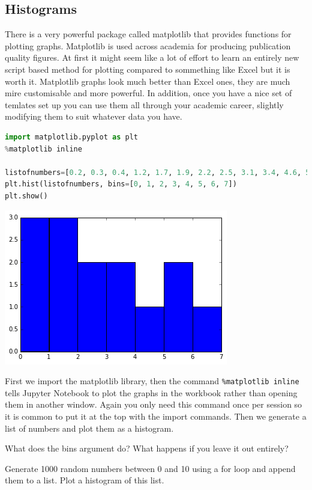	\subsection{Histograms}
		There is a very powerful package called matplotlib that provides functions for plotting graphs. Matplotlib is used across academia for producing publication quality figures. At first it might seem like a lot of effort to learn an entirely new script based method for plotting compared to sommething like Excel but it is worth it. Matplotlib graphs look much better than Excel ones, they are much mire customisable and more powerful. In addition, once you have a nice set of temlates set up you can use them all through your academic career, slightly modifying them to suit whatever data you have.
		\begin{lstlisting}[language=Python]
import matplotlib.pyplot as plt
%matplotlib inline

listofnumbers=[0.2, 0.3, 0.4, 1.2, 1.7, 1.9, 2.2, 2.5, 3.1, 3.4, 4.6, 5.1, 5.6, 6.0, 7.4, 7.4, 7.6]
plt.hist(listofnumbers, bins=[0, 1, 2, 3, 4, 5, 6, 7])
plt.show()\end{lstlisting}
		\includegraphics[scale=0.8]{images/histogram}

		First we import the matplotlib library, then the command \texttt{\%matplotlib inline} tells Jupyter Notebook to plot the graphs in the workbook rather than opening them in another window. Again you only need this command once per session so it is common to put it at the top with the import commands. Then we generate a list of numbers and plot them as a histogram.
		\begin{task}What does the bins argument do? What happens if you leave it out entirely?\end{task}
		\begin{task}Generate 1000 random numbers between 0 and 10 using a for loop and append them to a list. Plot a histogram of this list.\end{task}


